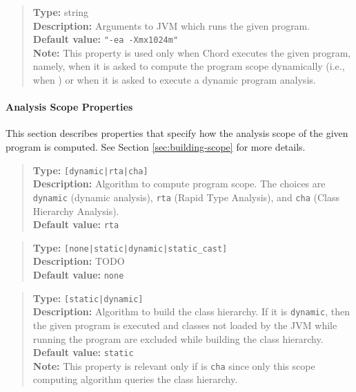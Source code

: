 \noindent {}
\begin{quote}
{\bf Type:} string \\
{\bf Description:} Arguments to JVM which runs the given program. \\
{\bf Default value:} {\tt "-ea -Xmx1024m"} \\
{\bf Note:} This property is used only when Chord executes the given program, namely, when it is asked to compute the program scope dynamically (i.e., when ) or when it is asked to execute a dynamic program analysis. 
\end{quote}

\paragraph{Analysis Scope Properties}

This section describes properties that specify how the analysis scope of the given program is computed.
See Section \ref{sec:building-scope} for more details.

\noindent {}
\begin{quote}
{\bf Type:} {\tt [dynamic|rta|cha]} \\
{\bf Description:} Algorithm to compute program scope.  The choices are {\tt dynamic} (dynamic analysis), {\tt rta} (Rapid Type Analysis), and {\tt cha} (Class Hierarchy Analysis). \\
{\bf Default value:} {\tt rta}
\end{quote}

\noindent {}
\begin{quote}
{\bf Type:} {\tt [none|static|dynamic|static_cast]} \\
{\bf Description:} TODO \\
{\bf Default value:} {\tt none}
\end{quote}

\noindent {}
\begin{quote}
{\bf Type:} {\tt [static|dynamic]} \\
{\bf Description:} Algorithm to build the class hierarchy.  If it is {\tt dynamic}, then the given program is executed and classes not loaded by the JVM while running the program are excluded while building the class hierarchy. \\
{\bf Default value:} {\tt static} \\
{\bf Note:} This property is relevant only if  is {\tt cha} since only this scope computing algorithm queries the class hierarchy. 
\end{quote}

